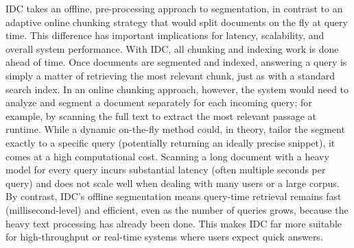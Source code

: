 \documentclass[12pt,a4paper]{report}
\begin{document}
IDC takes an offline, pre-processing approach to segmentation, in contrast to an adaptive online chunking strategy that would split documents on the fly at query time. This difference has important implications for latency, scalability, and overall system performance. With IDC, all chunking and indexing work is done ahead of time. Once documents are segmented and indexed, answering a query is simply a matter of retrieving the most relevant chunk, just as with a standard search index. In an online chunking approach, however, the system would need to analyze and segment a document separately for each incoming query; for example, by scanning the full text to extract the most relevant passage at runtime. While a dynamic on-the-fly method could, in theory, tailor the segment exactly to a specific query (potentially returning an ideally precise snippet), it comes at a high computational cost. Scanning a long document with a heavy model for every query incurs substantial latency (often multiple seconds per query) and does not scale well when dealing with many users or a large corpus. By contrast, IDC's offline segmentation means query-time retrieval remains fast (millisecond-level) and efficient, even as the number of queries grows, because the heavy text processing has already been done. This makes IDC far more suitable for high-throughput or real-time systems where users expect quick answers.
\end{document}
